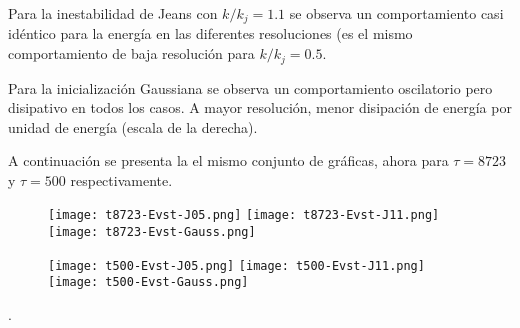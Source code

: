 \documentclass[notitlepage,letterpaper,12pt]{article} %
\begin{document}
Para la inestabilidad de Jeans con $k/k_j = 1.1$ se observa un comportamiento casi idéntico para la energía en las diferentes resoluciones (es el mismo comportamiento de baja resolución para $k/k_j = 0.5$.

Para la inicialización Gaussiana se observa un comportamiento oscilatorio pero disipativo en todos los casos.
A mayor resolución, menor disipación de energía por unidad de energía (escala de la derecha). 


A continuación se presenta la el mismo conjunto de gráficas, ahora para $\tau = 8723$ y $\tau = 500$ respectivamente.

\newpage

\begin{figure}[h]
  \centering
   \texttt{[image: t8723-Evst-J05.png]}
   \texttt{[image: t8723-Evst-J11.png]}
   \texttt{[image: t8723-Evst-Gauss.png]}
  \label{Evst para n}
\end{figure}

\newpage

\begin{figure}[h]
  \centering
   \texttt{[image: t500-Evst-J05.png]}
   \texttt{[image: t500-Evst-J11.png]}
   \texttt{[image: t500-Evst-Gauss.png]}
  \label{Evst para n}
\end{figure}

\newpage





.
\end{document}
